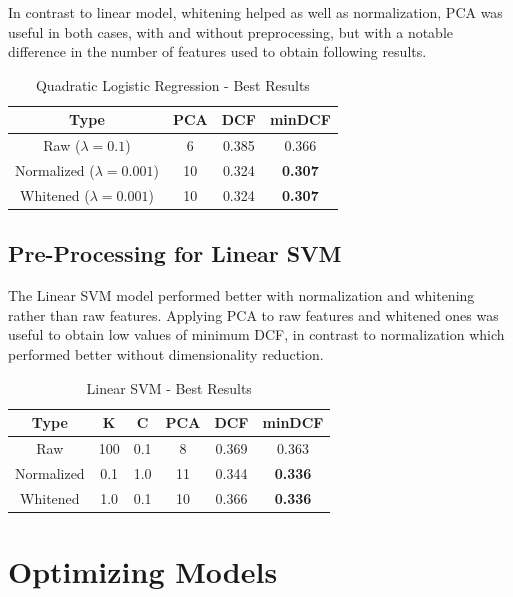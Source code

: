 \documentclass[12pt, twocolumn]{article}
\begin{document}
In contrast to linear model, whitening helped as well as normalization, PCA
was useful in both cases, with and without preprocessing, but with a notable difference
in the number of features used to obtain following results.

\begin{table}[H]
    \centering
        \begin{tabular}{||c|c|c|c||}
            \hline
            Type & PCA & DCF & minDCF \\
            \hline
            \hline
            Raw ($\lambda = 0.1$) & 6 & 0.385 &  0.366  \\
            Normalized ($\lambda = 0.001$) & 10 & 0.324 &  {\bf 0.307}  \\
            Whitened ($\lambda = 0.001$) & 10 & 0.324 &  {\bf 0.307}  \\
            \hline
    \end{tabular}
    \caption{Quadratic Logistic Regression - Best Results}
\end{table}

\subsection{Pre-Processing for Linear SVM}

The Linear SVM model performed better with normalization and whitening rather than raw features.
Applying PCA to raw features and whitened ones was useful to obtain low values of minimum DCF, in
contrast to normalization which performed better without dimensionality reduction.

\begin{table}[H]
    \centering
        \begin{tabular}{||c|c|c|c|c|c||}
            \hline
            Type & K & C & PCA & DCF & minDCF \\
            \hline
            \hline
            Raw & 100 & 0.1 & 8 & 0.369 &  0.363  \\
            Normalized & 0.1 & 1.0 & 11 & 0.344 &  {\bf 0.336}  \\
            Whitened & 1.0 & 0.1 & 10 & 0.366 &  {\bf 0.336}  \\
            \hline
    \end{tabular}
    \caption{Linear SVM - Best Results}
\end{table}

\section{Optimizing Models}
\end{document}
